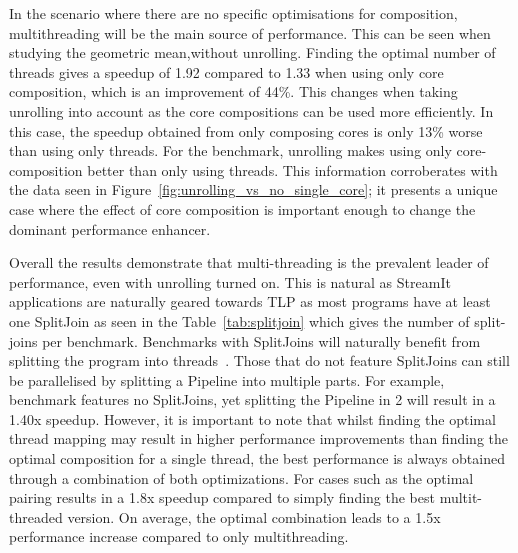 In the scenario where there are no specific optimisations for composition, multithreading will be the main source of performance.
This can be seen when studying the geometric mean,without unrolling.
Finding the optimal number of threads gives a speedup of 1.92 compared to 1.33 when using only core composition, which is an improvement of 44\%.
This changes when taking unrolling into account as the core compositions can be used more efficiently.
In this case, the speedup obtained from only composing cores is only 13\% worse than using only threads.
For the  benchmark, unrolling makes using only core-composition better than only using threads.
This information corroberates with the data seen in Figure~\ref{fig:unrolling_vs_no_single_core}; it presents a unique case where the effect of core composition is important enough to change the dominant performance enhancer.

Overall the results demonstrate that multi-threading is the prevalent leader of performance, even with unrolling turned on.
This is natural as StreamIt applications are naturally geared towards TLP as most programs have at least one SplitJoin as seen in the Table~\ref{tab:splitjoin} which gives the number of split-joins per benchmark.
Benchmarks with SplitJoins will naturally benefit from splitting the program into threads~\cite{thiesStreamit2010}.
Those that do not feature SplitJoins can still be parallelised by splitting a Pipeline into multiple parts.
For example, benchmark  features no SplitJoins, yet splitting the Pipeline in 2 will result in a 1.40x speedup.
However, it is important to note that whilst finding the optimal thread mapping may result in higher performance improvements than finding the optimal composition for a single thread, the best performance is always obtained through a combination of both optimizations.
For cases such as  the optimal pairing results in a 1.8x speedup compared to simply finding the best multit-threaded version.
On average, the optimal combination leads to a 1.5x performance increase compared to only multithreading.

